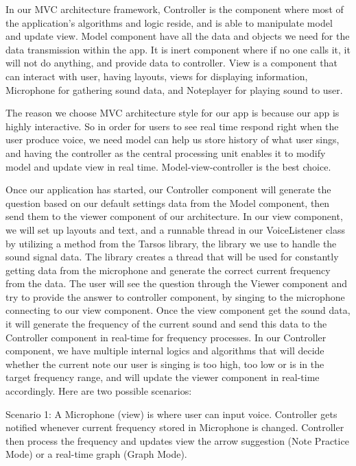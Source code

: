 \documentclass{article}
\begin{document}
In our MVC architecture framework, Controller is the component where most of the application’s algorithms and logic reside, and is able to manipulate model and update view. Model component have all the data and objects we need for the data transmission within the app. It is inert component where if no one calls it, it will not do anything, and provide data to controller.  View is a component that can interact with user, having layouts, views for displaying information, Microphone for gathering sound data, and Noteplayer for playing sound to user. 

The reason we choose MVC architecture style for our app is because our app is highly interactive. So  in order for users to see real time respond right when the user produce voice, we need  model can help us store history of what user sings, and having the controller as the central processing unit enables it to modify model and update view in real time. Model-view-controller is the best choice.

Once our application has started, our Controller component will generate the question based on our default settings data from the Model component, then send them to the viewer component of our architecture. In our view component, we will set up layouts and text, and a runnable thread in our VoiceListener class by utilizing a method from the Tarsos library, the library we use to handle the sound signal data. The library creates a thread that will be used for constantly getting data from the microphone and generate the correct current frequency from the data. The user will see the question through the Viewer component and try to provide the answer to controller component, by singing to the microphone connecting to our view component. Once the view component get the sound data, it will generate the frequency of the current sound and send this data to the Controller component in real-time for frequency processes. In our Controller component, we have multiple internal logics and algorithms that will decide whether the current note our user is singing is too high, too low or is in the target frequency range, and will update the viewer component in real-time accordingly. Here are two possible scenarios:

Scenario 1:
A Microphone (view) is where user can input voice. Controller gets notified whenever current frequency stored in Microphone is changed. Controller then process the frequency and updates view the arrow suggestion (Note Practice Mode) or a real-time graph (Graph Mode). 
\end{document}
